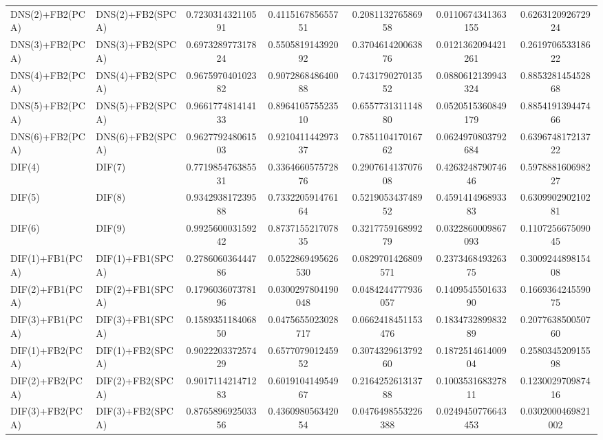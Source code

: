 \begin{table}[H]
\begin{tabular}{llSSSSS}
DNS(2)+FB2(PCA) & DNS(2)+FB2(SPCA) & 0.723031432110591 & 0.411516785655751 & 0.208113276586958 & 0.0110674341363155 & 0.626312092672924 \\ 
DNS(3)+FB2(PCA) & DNS(3)+FB2(SPCA) & 0.697328977317824 & 0.550581914392092 & 0.370461420063876 & 0.0121362094421261 & 0.261970653318622 \\ 
DNS(4)+FB2(PCA) & DNS(4)+FB2(SPCA) & 0.967597040102382 & 0.907286848640088 & 0.743179027013552 & 0.0880612139943324 & 0.885328145452868 \\ 
DNS(5)+FB2(PCA) & DNS(5)+FB2(SPCA) & 0.966177481414133 & 0.896410575523510 & 0.655773131114880 & 0.0520515360849179 & 0.885419139447466 \\ 
DNS(6)+FB2(PCA) & DNS(6)+FB2(SPCA) & 0.962779248061503 & 0.921041144297337 & 0.785110417016762 & 0.0624970803792684 & 0.639674817213722 \\ 
DIF(4) & DIF(7) & 0.771985476385531 & 0.336466057572876 & 0.290761413707608 & 0.426324879074646 & 0.597888160698227 \\ 
DIF(5) & DIF(8) & 0.934293817239588 & 0.733220591476164 & 0.521905343748952 & 0.459141496893383 & 0.630990290210281 \\ 
DIF(6) & DIF(9) & 0.992560003159242 & 0.873715521707835 & 0.321775916899279 & 0.0322860009867093 & 0.110725667509045 \\ 
DIF(1)+FB1(PCA) & DIF(1)+FB1(SPCA) & 0.278606036444786 & 0.0522869495626530 & 0.0829701426809571 & 0.237346849326375 & 0.300924489815408 \\ 
DIF(2)+FB1(PCA) & DIF(2)+FB1(SPCA) & 0.179603607378196 & 0.0300297804190048 & 0.0484244777936057 & 0.140954550163390 & 0.166936424559075 \\ 
DIF(3)+FB1(PCA) & DIF(3)+FB1(SPCA) & 0.158935118406850 & 0.0475655023028717 & 0.0662418451153476 & 0.183473289983289 & 0.207763850050760 \\ 
DIF(1)+FB2(PCA) & DIF(1)+FB2(SPCA) & 0.902220337257429 & 0.657707901245952 & 0.307432961379260 & 0.187251461400904 & 0.258034520915598 \\ 
DIF(2)+FB2(PCA) & DIF(2)+FB2(SPCA) & 0.901711421471283 & 0.601910414954967 & 0.216425261313788 & 0.100353168327811 & 0.123002970987416 \\ 
DIF(3)+FB2(PCA) & DIF(3)+FB2(SPCA) & 0.876589692503356 & 0.436098056342054 & 0.0476498553226388 & 0.0249450776643453 & 0.0302000469821002 \\ \bottomrule 
\end{tabular}
\end{table}